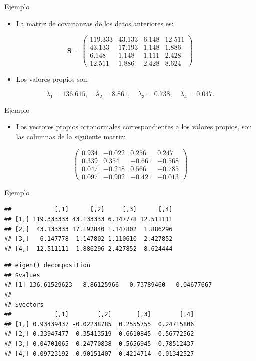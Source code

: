 \documentclass[
  ignorenonframetext,
]{beamer}
\providecommand{\tightlist}{%
  \setlength{\itemsep}{0pt}\setlength{\parskip}{0pt}}
\begin{document}
\begin{frame}{Ejemplo}
\protect\hypertarget{ejemplo-2}{}
\begin{itemize}
\tightlist
\item
  La matriz de covarianzas de los datos anteriores es:
\end{itemize}

\[
\mathbf{S}=
\begin{pmatrix}
119.333 & 43.133 & 6.148 & 12.511 \\
 43.133 & 17.193 & 1.148 & 1.886 \\
 6.148 & 1.148 & 1.111 & 2.428 \\
 12.511 & 1.886 & 2.428 & 8.624 
\end{pmatrix}
\]

\begin{itemize}
\tightlist
\item
  Los valores propios son:
\end{itemize}

\[\lambda_1=136.615,\quad \lambda_2=8.861,\quad \lambda_3 = 0.738,\quad \lambda_4 = 0.047.\]
\end{frame}

\begin{frame}{Ejemplo}
\protect\hypertarget{ejemplo-3}{}
\begin{itemize}
\tightlist
\item
  Los vectores propios ortonormales correspondientes a los valores
  propios, son las columnas de la siguiente matriz:
\end{itemize}

\[
\left(
\begin{array}{rrrr}
0.934 & -0.022 & 0.256 & 0.247 \\
0.339 & 0.354 & -0.661 & -0.568 \\
0.047 & -0.248 & 0.566 & -0.785 \\
0.097 & -0.902 & -0.421 & -0.013
\end{array}
\right)
\]
\end{frame}

\begin{frame}[fragile]{Ejemplo}
\protect\hypertarget{ejemplo-4}{}
\begin{verbatim}
##            [,1]      [,2]     [,3]      [,4]
## [1,] 119.333333 43.133333 6.147778 12.511111
## [2,]  43.133333 17.192840 1.147802  1.886296
## [3,]   6.147778  1.147802 1.110610  2.427852
## [4,]  12.511111  1.886296 2.427852  8.624444
\end{verbatim}

\begin{verbatim}
## eigen() decomposition
## $values
## [1] 136.61529623   8.86125966   0.73789460   0.04677667
## 
## $vectors
##            [,1]        [,2]       [,3]        [,4]
## [1,] 0.93439437 -0.02238785  0.2555755  0.24715806
## [2,] 0.33947477  0.35413519 -0.6610845 -0.56772562
## [3,] 0.04701065 -0.24770838  0.5656945 -0.78512437
## [4,] 0.09723192 -0.90151407 -0.4214714 -0.01342527
\end{verbatim}
\end{frame}
\end{document}

